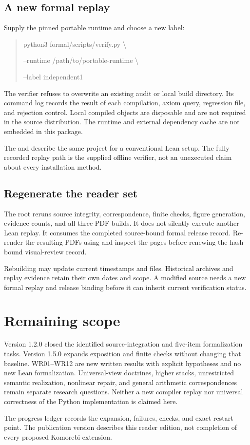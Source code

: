 \documentclass[11pt]{article}
\begin{document}
\subsection{A new formal replay}
Supply the pinned portable runtime and choose a new label:
\begin{quote}\small\ttfamily
python3 formal/scripts/verify.py \textbackslash\par
\hspace*{1em}--runtime /path/to/portable-runtime \textbackslash\par
\hspace*{1em}--label independent1
\end{quote}
The verifier refuses to overwrite an existing audit or local build directory. Its command log records the result of each compilation, axiom query, regression file, and rejection control. Local compiled objects are disposable and are not required in the source distribution. The runtime and external dependency cache are not embedded in this package.

The  and  describe the same project for a conventional Lean setup. The fully recorded replay path is the supplied offline verifier, not an unexecuted claim about every installation method.

\subsection{Regenerate the reader set}
The root  reruns source integrity, correspondence, finite checks, figure generation, evidence counts, and all three PDF builds. It does not silently execute another Lean replay. It consumes the completed source-bound formal release record. Re-render the resulting PDFs using  and inspect the pages before renewing the hash-bound visual-review record.

Rebuilding may update current timestamps and files. Historical archives and replay evidence retain their own dates and scope. A modified source needs a new formal replay and release binding before it can inherit current verification status.

\section{Remaining scope}
Version 1.2.0 closed the identified source-integration and five-item formalization tasks. Version 1.5.0 expands exposition and finite checks without changing that baseline. WR01--WR12 are new written results with explicit hypotheses and no new Lean formalization. Universal-view doctrines, higher stacks, unrestricted semantic realization, nonlinear repair, and general arithmetic correspondences remain separate research questions. Neither a new compiler replay nor universal correctness of the Python implementation is claimed here.

The progress ledger records the expansion, failures, checks, and exact restart point. The publication version describes this reader edition, not completion of every proposed Komorebi extension.
\end{document}
